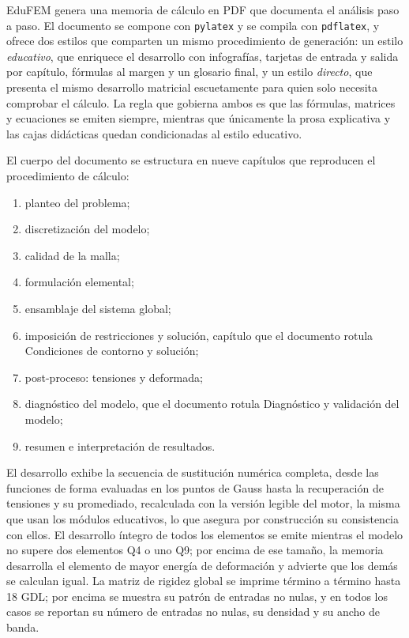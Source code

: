 EduFEM genera una memoria de cálculo en PDF que documenta el análisis paso a paso. El documento se compone con \texttt{pylatex} y se compila con \texttt{pdflatex}, y ofrece dos estilos que comparten un mismo procedimiento de generación: un estilo \emph{educativo}, que enriquece el desarrollo con infografías, tarjetas de entrada y salida por capítulo, fórmulas al margen y un glosario final, y un estilo \emph{directo}, que presenta el mismo desarrollo matricial escuetamente para quien solo necesita comprobar el cálculo. La regla que gobierna ambos es que las fórmulas, matrices y ecuaciones se emiten siempre, mientras que únicamente la prosa explicativa y las cajas didácticas quedan condicionadas al estilo educativo.

El cuerpo del documento se estructura en nueve capítulos que reproducen el procedimiento de cálculo:
\begin{enumerate}
    \item planteo del problema;
    \item discretización del modelo;
    \item calidad de la malla;
    \item formulación elemental;
    \item ensamblaje del sistema global;
    \item imposición de restricciones y solución, capítulo que el documento rotula \textsf{Condiciones de contorno y solución};
    \item post-proceso: tensiones y deformada;
    \item diagnóstico del modelo, que el documento rotula \textsf{Diagnóstico y validación del modelo};
    \item resumen e interpretación de resultados.
\end{enumerate}
El desarrollo exhibe la secuencia de sustitución numérica completa, desde las funciones de forma evaluadas en los puntos de Gauss hasta la recuperación de tensiones y su promediado, recalculada con la versión legible del motor, la misma que usan los módulos educativos, lo que asegura por construcción su consistencia con ellos. El desarrollo íntegro de todos los elementos se emite mientras el modelo no supere dos elementos Q4 o uno Q9; por encima de ese tamaño, la memoria desarrolla el elemento de mayor energía de deformación y advierte que los demás se calculan igual. La matriz de rigidez global se imprime término a término hasta 18 GDL; por encima se muestra su patrón de entradas no nulas, y en todos los casos se reportan su número de entradas no nulas, su densidad y su ancho de banda.

